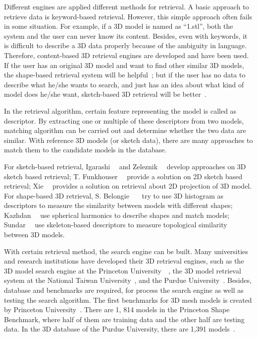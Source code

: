 Different engines are applied different methods for retrieval. A basic approach to retrieve data is keyword-based retrieval. However, this simple approach often fails in some situation. For example, if a 3D model is named as ``1.stl'', both the system and the user can never know its content. Besides, even with keywords, it is difficult to describe a 3D data properly because of the ambiguity in language. Therefore, content-based 3D retrieval engines are developed and have been used. If the user has an original 3D model and want to find other similar 3D models, the shape-based retrieval system will be helpful~\cite{Funkhouser:2003:SEM:588272.588279}; but if the user has no data to describe what he/she wants to search, and just has an idea about what kind of model does he/she want, sketch-based 3D retrieval will be better~\cite{CGF:CGF12200}. 

In the retrieval algorithm, certain feature representing the model is called as descriptor. By extracting one or multiple of these descriptors from two models, matching algorithm can be carried out and determine whether the two data are similar. With reference 3D models (or sketch data), there are many approaches to match them to the candidate models in the database. 

For sketch-based retrieval, Igarashi~\etal~\cite{Igarashi:2007:TSI:1281500.1281532} and Zeleznik~\etal~\cite{Zeleznik:2007:SIS:1281500.1281530} develop approaches on 3D sketch based retrieval; T. Funkhouser~\etal~\cite{Funkhouser:2003:SEM:588272.588279} provide a solution on 2D sketch based retrieval; Xie~\etal~\cite{CGF:CGF12200} provides a solution on retrieval about 2D projection of 3D model. For shape-based 3D retrieval, S. Belongie~\etal~\cite{belongie2001matching}~\cite{belongie2002shape} try to use 3D histogram as descriptors to measure the similarity between models with different shapes; Kazhdan~\etal~\cite{kazhdan2003rotation} use spherical harmonics to describe shapes and match models; Sundar~\etal~\cite{sundar2003skeleton} use skeleton-based descriptors to measure topological similarity between 3D models. 

With certain retrieval method, the search engine can be built. Many universities and research institutions have developed their 3D retrieval engines, such as the 3D model search engine at the Princeton University~\cite{shilane2004princeton}~\cite{min2003early}, the 3D model retrieval system at the National Taiwan University~\cite{shen20033d}, and the Purdue University~\cite{iyer2005engineering}. Besides, database and benchmarks are required, for process the search engine as well as testing the search algorithm. The first benchmarks for 3D mesh models is created by Princeton University~\cite{shilane2004princeton}. There are 1, 814 models in the Princeton Shape Benchmark, where half of them are training data and the other half are testing data. In the 3D database of the Purdue University, there are 1,391 models~\cite{iyer2005engineering}.


